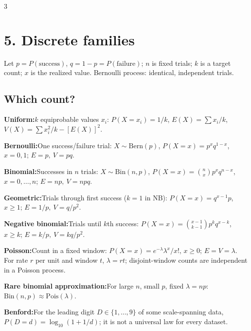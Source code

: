 \documentclass[10pt,a4paper,landscape]{article}
\newcommand{\CheatNote}[2]{\par\noindent\textcolor{cueorange}{\textbf{#1:}}\;#2\par}
\newenvironment{QuickPointers}[1][Quick pointers]{\subsection*{#1}\begingroup\setlength{\parskip}{0pt}}{\endgroup}
\newcommand{\Pointer}[2]{\par\noindent\textbf{#1:}\;#2\par}
\begin{document}
\begin{multicols}{3}
\section*{5. Discrete families}
Let \(p=P(\text{success})\), \(q=1-p=P(\text{failure})\); \(n\) is fixed trials; \(k\) is a target count; \(x\) is the realized value. Bernoulli process: identical, independent trials.
\begin{QuickPointers}[Which count?]
\Pointer{Uniform}{\(k\) equiprobable values \(x_i\): \(P(X=x_i)=1/k\), \(E(X)=\sum x_i/k\), \(V(X)=\sum x_i^2/k-[E(X)]^2\).}
\Pointer{Bernoulli}{One success/failure trial: \(X\sim\mathrm{Bern}(p)\), \(P(X=x)=p^xq^{1-x}\), \(x=0,1\); \(E=p,\ V=pq\).}
\Pointer{Binomial}{Successes in \(n\) trials: \(X\sim\mathrm{Bin}(n,p)\), \(P(X=x)={n\choose x}p^xq^{n-x}\), \(x=0,\ldots,n\); \(E=np,\ V=npq\).}
\Pointer{Geometric}{Trials through first success (\(k=1\) in NB): \(P(X=x)=q^{x-1}p\), \(x\ge1\); \(E=1/p,\ V=q/p^2\).}
\Pointer{Negative binomial}{Trials until \(k\)th success: \(P(X=x)={x-1\choose k-1}p^kq^{x-k}\), \(x\ge k\); \(E=k/p,\ V=kq/p^2\).}
\Pointer{Poisson}{Count in a fixed window: \(P(X=x)=e^{-\lambda}\lambda^x/x!\), \(x\ge0\); \(E=V=\lambda\). For rate \(r\) per unit and window \(t\), \(\lambda=rt\); disjoint-window counts are independent in a Poisson process.}
\end{QuickPointers}
\CheatNote{Rare binomial approximation}{For large \(n\), small \(p\), fixed \(\lambda=np\): \(\mathrm{Bin}(n,p)\approx\mathrm{Pois}(\lambda)\).}
\CheatNote{Benford}{For the leading digit \(D\in\{1,\ldots,9\}\) of some scale-spanning data, \(P(D=d)=\log_{10}(1+1/d)\); it is not a universal law for every dataset.}


\end{multicols}
\end{document}
